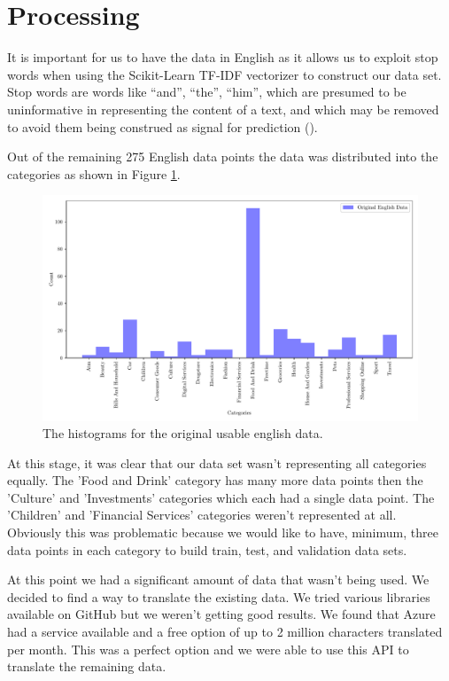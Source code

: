 \section{Processing}

It is important for us to have the data in English as it allows us to exploit stop words when using the Scikit-Learn TF-IDF vectorizer to construct our data set. Stop words are words like “and”, “the”, “him”, which are presumed to be uninformative in representing the content of a text, and which may be removed to avoid them being construed as signal for prediction (\cite{sklearn62feature}).

Out of the remaining 275 English data points the data was distributed into the categories as shown in Figure \ref{fig:original_english_counts}.

\begin{figure}[!ht]
  \centering
  \includegraphics[width=\textwidth]{../img/plot_original_english_counts.pdf}
  \caption{The histograms for the original usable english data.}
  \label{fig:original_english_counts}
\end{figure}

At this stage, it was clear that our data set wasn't representing all categories equally. The 'Food and Drink' category has many more data points then the 'Culture' and 'Investments' categories which each had a single data point. The 'Children' and 'Financial Services' categories weren't represented at all. Obviously this was problematic because we would like to have, minimum, three data points in each category to build train, test, and validation data sets.

At this point we had a significant amount of data that wasn't being used. We decided to find a way to translate the existing data. We tried various libraries available on GitHub but we weren't getting good results. We found that Azure had a service available and a free option of up to 2 million characters translated per month. This was a perfect option and we were able to use this API to translate the remaining data.

